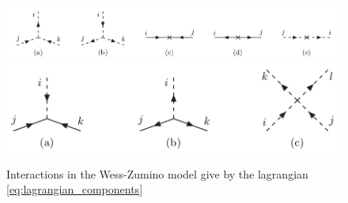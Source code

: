 \documentclass[12pt]{article}
\begin{document}
\begin{figure}
  \centering 
  \includegraphics[scale=0.3]{images/feynman1.png}
  \includegraphics[scale=0.3]{images/feynman2.png}
  \caption{Interactions in the Wess-Zumino model give by the lagrangian \ref{eq:lagrangian_components}}
  \label{WZ_interactions}
\end{figure}


\newpage
\end{document}
